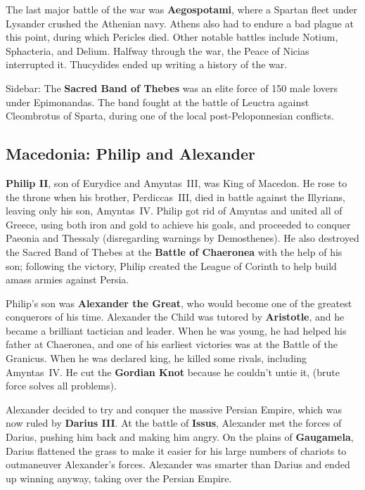 The last major battle of the war was \textbf{Aegospotami},
where a Spartan fleet under Lysander crushed the Athenian navy.
Athens also had to endure a bad plague at this point, during which Pericles died.
Other notable battles include Notium, Sphacteria, and Delium.
Halfway through the war, the Peace of Nicias interrupted it.
Thucydides ended up writing a history of the war.

Sidebar: The \textbf{Sacred Band of Thebes} was an elite force of 150 male lovers under Epimonandas.
The band fought at the battle of Leuctra against Cleombrotus of Sparta,
during one of the local post-Peloponnesian conflicts.

\subsection*{Macedonia: Philip and Alexander}

\textbf{Philip II}, son of Eurydice and Amyntas~III, was King of Macedon.
He rose to the throne when his brother, Perdiccas~III,
died in battle against the Illyrians, leaving only his son, Amyntas~IV\@.
Philip got rid of Amyntas and united all of Greece,
using both iron and gold to achieve his goals,
and proceeded to conquer Paeonia and Thessaly (disregarding warnings by Demosthenes).
He also destroyed the Sacred Band of Thebes at the \textbf{Battle of Chaeronea} with the help of his son;
following the victory,
Philip created the League of Corinth to help build amass armies against Persia.

Philip's son was \textbf{Alexander the Great}, who would become one of the greatest conquerors of his time.
Alexander the Child was tutored by \textbf{Aristotle}, and he became a brilliant tactician and leader.
When he was young, he had helped his father at Chaeronea,
and one of his earliest victories was at the Battle of the Granicus.
When he was declared king, he killed some rivals, including Amyntas~IV\@.
He cut the \textbf{Gordian Knot} because he couldn't untie it,
(brute force solves all problems).

Alexander decided to try and conquer the massive Persian Empire, which was now ruled by \textbf{Darius III}\@.
At the battle of \textbf{Issus}, Alexander met the forces of Darius, pushing him back and making him angry.
On the plains of \textbf{Gaugamela},
Darius flattened the grass to make it easier for his large numbers of chariots to outmaneuver Alexander's forces.
Alexander was smarter than Darius and ended up winning anyway, taking over the Persian Empire.

